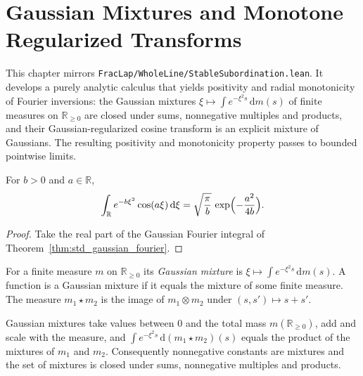 \chapter{Gaussian Mixtures and Monotone Regularized Transforms}

This chapter mirrors \texttt{FracLap/WholeLine/StableSubordination.lean}. It develops a purely analytic calculus that yields positivity and radial monotonicity of Fourier inversions: the Gaussian mixtures $\xi \mapsto \int e^{-\xi^2 s}\, \mathrm{d}m(s)$ of finite measures on $\mathbb{R}_{\ge 0}$ are closed under sums, nonnegative multiples and products, and their Gaussian-regularized cosine transform is an explicit mixture of Gaussians. The resulting positivity and monotonicity property passes to bounded pointwise limits.

\begin{lemma}\label{lem:gaussian_cosine_integral}
\leanok
For $b > 0$ and $a \in \mathbb{R}$,
\[
  \int_{\mathbb{R}} e^{-b \xi^2} \cos(a \xi)\, \mathrm{d}\xi = \sqrt{\frac{\pi}{b}}\, \exp\Bigl(-\frac{a^2}{4b}\Bigr).
\]
\end{lemma}

\begin{proof}
\leanok
Take the real part of the Gaussian Fourier integral of Theorem~\ref{thm:std_gaussian_fourier}.
\end{proof}

\begin{definition}\label{def:gauss_mixture}
\leanok
For a finite measure $m$ on $\mathbb{R}_{\ge 0}$ its \emph{Gaussian mixture} is $\xi \mapsto \int e^{-\xi^2 s}\, \mathrm{d}m(s)$. A function is a Gaussian mixture if it equals the mixture of some finite measure. The measure $m_1 \star m_2$ is the image of $m_1 \otimes m_2$ under $(s, s') \mapsto s + s'$.
\end{definition}

\begin{lemma}\label{lem:gauss_mixture_closure}
\leanok
Gaussian mixtures take values between $0$ and the total mass $m(\mathbb{R}_{\ge 0})$, add and scale with the measure, and $\int e^{-\xi^2 s}\, \mathrm{d}(m_1 \star m_2)(s)$ equals the product of the mixtures of $m_1$ and $m_2$. Consequently nonnegative constants are mixtures and the set of mixtures is closed under sums, nonnegative multiples and products.
\end{lemma}

